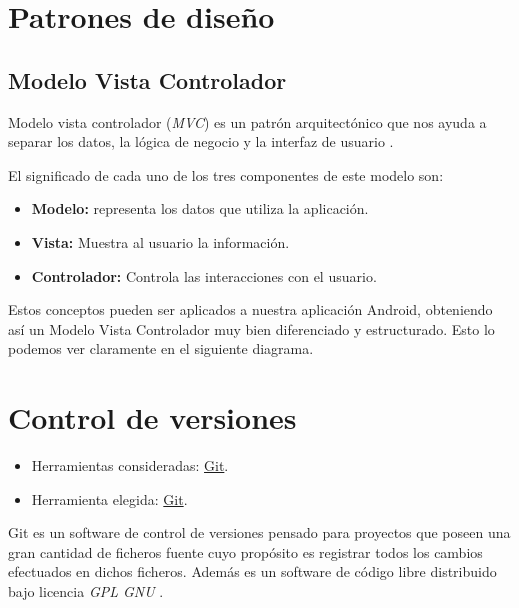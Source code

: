 
\section{Patrones de diseño}
\subsection{Modelo Vista Controlador}

Modelo vista controlador (\emph{MVC}) es un patrón arquitectónico que nos ayuda a separar los datos, la lógica de negocio y la interfaz de usuario \cite{mvc:wiki}.


El significado de cada uno de los tres componentes de este modelo son:

\begin{itemize}
	\tightlist
	\item
	\textbf{Modelo:} representa los datos que utiliza la aplicación.
	\item
	\textbf{Vista:} Muestra al usuario la información.
	\item
	\textbf{Controlador:} Controla las interacciones con el usuario.
\end{itemize}


Estos conceptos pueden ser aplicados a nuestra aplicación Android, obteniendo así un Modelo Vista Controlador muy bien diferenciado y estructurado. Esto lo podemos ver claramente en el siguiente diagrama.

\section{Control de versiones}

\begin{itemize}
	\tightlist
	\item
	Herramientas consideradas: \href{https://git-scm.com/}{Git}.
	\item
	Herramienta elegida: \href{https://git-scm.com/}{Git}.
\end{itemize}

Git es un software de control de versiones pensado para proyectos que poseen una gran cantidad de ficheros fuente cuyo propósito es registrar todos los cambios efectuados en dichos ficheros. Además es un software de código libre distribuido bajo licencia \textit{GPL GNU} \cite{git:wiki}.

